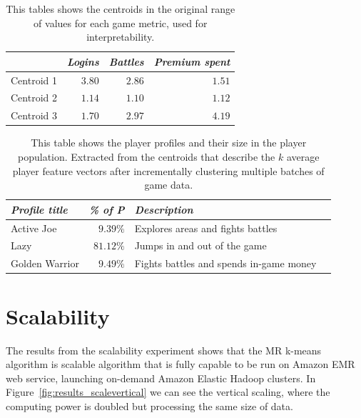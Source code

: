 \begin{table}[h]
\centering
\begin{tabular}{| l | r | r | r |}
    \hline
    & \textit{Logins} & \textit{Battles} & \textit{Premium spent} \\ \hline
    Centroid 1 & $3.80$ & $2.86$ & $1.51$  \\ \hline
    Centroid 2 & $1.14$ & $1.10$ & $1.12$  \\ \hline
    Centroid 3 & $1.70$ & $2.97$ & $4.19$ \\ \hline
\end{tabular}
\caption{This tables shows the centroids in the original range of values for each game metric, used for interpretability.}
\label{tab:results_centroidsoriginalvalues}
\end{table}

\begin{table}[h]
\centering
\begin{tabular}{| l | r | l | l |}
    \hline
    \textit{Profile title} & \textit{\% of P} & \textit{Description} \\ \hline
    Active Joe & $9.39\%$ & Explores areas and fights battles \\ \hline
    Lazy & $81.12\%$ &  Jumps in and out of the game \\ \hline
    Golden Warrior & $9.49\%$ & Fights battles and spends in-game money \\ \hline
\end{tabular}
\caption{This table shows the player profiles and their size in the player population. Extracted from the centroids that describe the $k$ average player feature vectors after incrementally clustering multiple batches of game data.}
\label{tab:results_playerprofiles}
\end{table}


\newpage
\section{Scalability}
The results from the scalability experiment shows that the MR k-means algorithm is scalable algorithm that is fully capable to be run on Amazon EMR web service, launching on-demand Amazon Elastic Hadoop clusters. In Figure~\ref{fig:results_scalevertical} we can see the vertical scaling, where the computing power is doubled but processing the same size of data. 

